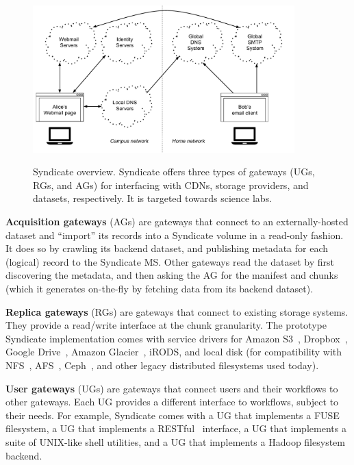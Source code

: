 \begin{figure}[h]
   \caption{Syndicate overview.  Syndicate offers three types of gateways (UGs,
   RGs, and AGs) for interfacing with CDNs, storage providers, and datasets,
   respectively.  It is targeted towards science labs.}
   \centering
   \includegraphics[width=0.9\textwidth,page=20]{figures/dissertation-figures}
   \label{fig:chap3-syndicate-overview}
\end{figure}

\textbf{Acquisition gateways} (AGs) are gateways that connect to an externally-hosted
dataset and ``import'' its records into a Syndicate volume in a read-only
fashion.  It does so by crawling its backend dataset, and publishing metadata
for each (logical) record to the Syndicate MS.  Other gateways read the dataset
by first discovering the metadata, and then asking the AG for the manifest and
chunks (which it generates on-the-fly by fetching data from its backend
dataset).

\textbf{Replica gateways} (RGs) are gateways that connect to existing storage
systems.  They provide a read/write interface at the chunk granularity.
The prototype Syndicate implementation comes with service drivers for Amazon S3~\cite{s3}, Dropbox~\cite{dropbox},
Google Drive~\cite{gdrive}, Amazon Glacier~\cite{amazon-glacier}, iRODS,
and local disk (for compatibility with NFS~\cite{nfs}, AFS~\cite{afs},
Ceph~\cite{ceph}, and other legacy distributed filesystems used today).

\textbf{User gateways} (UGs) are gateways that connect users and their workflows
to other gateways.  Each UG provides a different interface to workflows, subject
to their needs.  For example, Syndicate comes with a UG that implements a
FUSE~\cite{fuse} filesystem, a UG that implements a RESTful~\cite{rest}
interface, a UG that implements a suite of UNIX-like shell utilities, and a UG
that implements a Hadoop filesystem~\cite{hadoop} backend.

